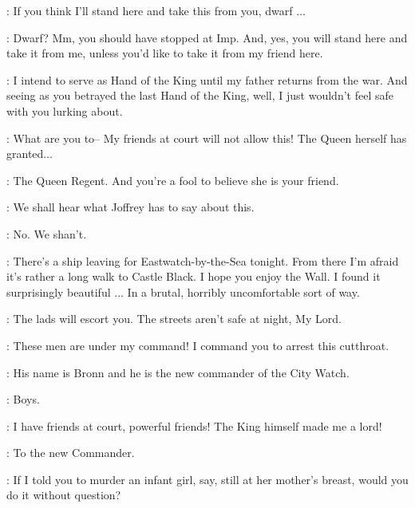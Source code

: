 \JANOSSLYNT: If you think I'll stand here and take this from you, dwarf $\ldots$

\TYRION: Dwarf? Mm, you should have stopped at Imp. And, yes, you will stand here and take it from me, unless you'd like to take it from my friend here.


\TYRION: I intend to serve as Hand of the King until my father returns from the war. And seeing as you betrayed the last Hand of the King, well, I just wouldn't feel safe with you lurking about.

\JANOSSLYNT: What are you to-- My friends at court will not allow this! The Queen herself has granted$\ldots$

\TYRION: The Queen Regent. And you're a fool to believe she is your friend.

\JANOSSLYNT: We shall hear what Joffrey has to say about this.

\TYRION: No. We shan't.


\TYRION: There's a ship leaving for Eastwatch-by-the-Sea tonight. From there I'm afraid it's rather a long walk to Castle Black. I hope you enjoy the Wall. I found it surprisingly beautiful $\ldots$ In a brutal, horribly uncomfortable sort of way.

\BRONN: The lads will escort you. The streets aren't safe at night, My Lord.

\JANOSSLYNT: These men are under my command! I command you to arrest this cutthroat.

\TYRION: His name is Bronn and he is the new commander of the City Watch.

\BRONN: Boys.


\JANOSSLYNT: I have friends at court, powerful friends! The King himself made me a lord!


\TYRION: To the new Commander.


\TYRION: If I told you to murder an infant girl, say, still at her mother's breast, would you do it without question?

